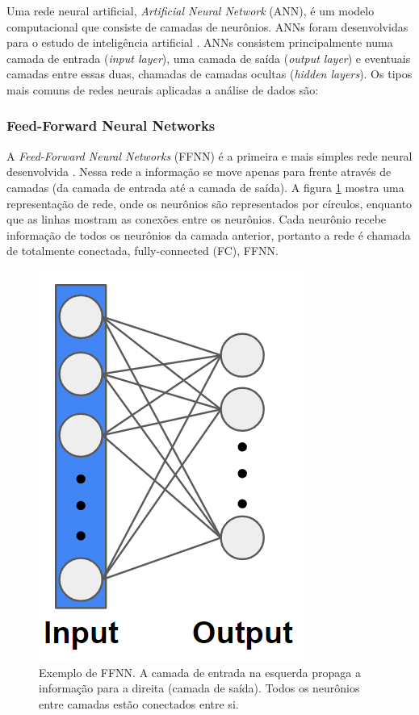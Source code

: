 \documentclass[a4paper,12pt,oneside]{book}
\begin{document}

\par Uma rede neural artificial, \textit{Artificial Neural Network} (ANN), é um modelo computacional que consiste de camadas de neurônios. ANNs foram desenvolvidas para o estudo de inteligência artificial \cite{mlbook, mldiverso}. ANNs consistem principalmente numa camada de entrada (\textit{input layer}), uma camada de saída (\textit{output layer}) e eventuais camadas entre essas duas, chamadas de camadas ocultas (\textit{hidden layers}). Os tipos mais comuns de redes neurais aplicadas a análise de dados são:

\subsubsection*{Feed-Forward Neural Networks}

\par A \textit{Feed-Forward Neural Networks} (FFNN) é a primeira e mais simples rede neural desenvolvida \cite{talent_ml, bishop2016pattern}. Nessa rede a informação se move apenas para frente através de camadas (da camada de entrada até a camada de saída). A figura \ref{fig:FFNN} mostra uma representação de rede, onde os neurônios são representados por círculos, enquanto que as linhas mostram as conexões entre os neurônios. Cada neurônio recebe informação de todos os neurônios da camada anterior, portanto a rede é chamada de totalmente conectada, fully-connected (FC), FFNN.

\begin{figure}[H]
    \centering
    \includegraphics[scale = 0.55]{figs/FFNN.png}
    \caption{Exemplo de FFNN. A camada de entrada na esquerda propaga a informação para a direita (camada de saída). Todos os neurônios entre camadas estão conectados entre si.}
    \label{fig:FFNN}
\end{figure}
\end{document}
